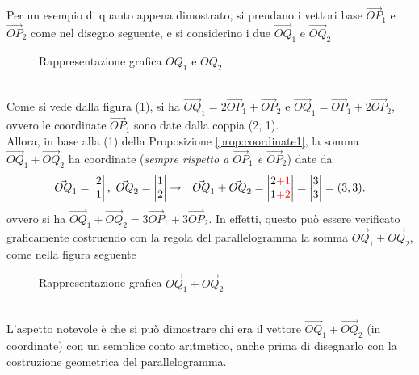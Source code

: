 \begin{es}
  \label{es:coordinate1}
  Per un esempio di quanto appena dimostrato, si prendano i vettori base $\vec{OP}_1$ e $\vec{OP}_2$ come nel disegno seguente, e si considerino i due $\vec{OQ}_1$ e $\vec{OQ}_2$
  \begin{figure}[ht!]
  \centering
  \resizebox{4cm}{!}{
      
    }
  \caption{Rappresentazione grafica $OQ_1$ e $OQ_2$}
  \label{fig:coordinate1-1}
\end{figure}\\
Come si vede dalla figura (\ref{fig:coordinate1-1}), si ha $\vec{OQ}_1=2\vec{OP}_1+\vec{OP}_2$ e $\vec{OQ}_1=\vec{OP}_1+2\vec{OP}_2$, ovvero le coordinate $\vec{OP}_1$ sono date dalla coppia (2, 1).\\
Allora, in base alla (1) della Proposizione \ref{prop:coordinate1}, la somma $\vec{OQ}_1+\vec{OQ}_2$ ha coordinate (\textit{sempre rispetto a $\vec{OP}_1$ e $\vec{OP}_2$}) date da 
\begin{eqnarray*}
  \vec{OQ}_1=
  \begin{vmatrix}
    2\\
    1
  \end{vmatrix},\text{ } \vec{OQ}_2=
  \begin{vmatrix}
    1\\
    2
  \end{vmatrix} &\to& \vec{OQ}_1+\vec{OQ}_2=
                  \begin{vmatrix}
                    2{\color{red}+1}\\
                    1{\color{red}+2}
                  \end{vmatrix}=
                  \begin{vmatrix}
                    3\\
                    3
                  \end{vmatrix}= (3,3).
\end{eqnarray*}
ovvero si ha $\vec{OQ}_1+\vec{OQ}_2=3\vec{OP}_1+3\vec{OP}_2$. In effetti, questo può essere verificato graficamente costruendo con la regola del parallelogramma la somma $\vec{OQ}_1+\vec{OQ}_2$, come nella figura seguente
  \begin{figure}[ht!]
  \centering
  \resizebox{3.4cm}{!}{
      
    }
  \caption{Rappresentazione grafica $\vec{OQ}_1+\vec{OQ}_2$}
  \label{fig:coordinate1-2}
\end{figure}\\
L'aspetto notevole è che si può dimostrare chi era il vettore $\vec{OQ}_1+\vec{OQ}_2$ (in coordinate) con un semplice conto aritmetico, anche prima di disegnarlo con la costruzione geometrica del parallelogramma.
\end{es}
